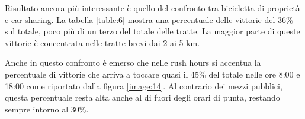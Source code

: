Risultato ancora più interessante è quello del confronto tra bicicletta di proprietà e car sharing. La tabella \ref{table:6} mostra una percentuale delle vittorie del 36\% sul totale, poco più di un terzo del totale delle tratte. La maggior parte di queste vittorie è concentrata nelle tratte brevi dai 2 ai 5 km.

Anche in questo confronto è emerso che nelle rush hours si accentua la percentuale di vittorie che arriva a toccare quasi il 45\% del totale nelle ore 8:00 e 18:00 come riportato dalla figura \ref{image:14}. Al contrario dei mezzi pubblici, questa percentuale resta alta anche al di fuori degli orari di punta, restando sempre intorno al 30\%.



















